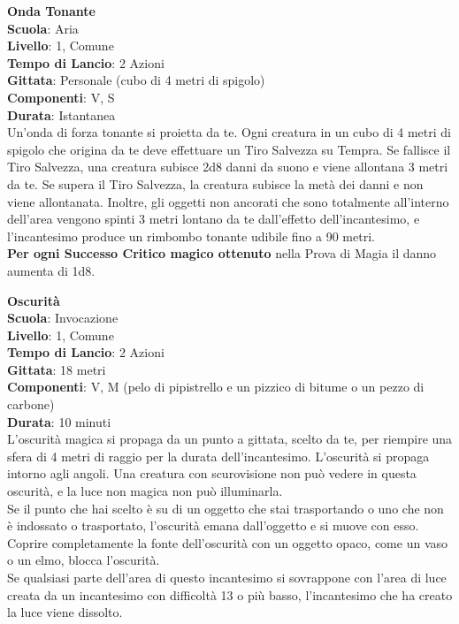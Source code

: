 \begin{multicols}{2}
\medskip\textbf{Onda Tonante}\\
\textbf{Scuola}: Aria\\
\textbf{Livello}: 1, Comune\\
\textbf{Tempo di Lancio}: 2 Azioni\\
\textbf{Gittata}: Personale (cubo di 4 metri di spigolo)\\
\textbf{Componenti}: V, S\\
\textbf{Durata}: Istantanea\\
Un'onda di forza tonante si proietta da te. Ogni creatura in un cubo di 4 metri di spigolo che origina da te deve effettuare un Tiro Salvezza su Tempra. Se fallisce il Tiro Salvezza, una creatura subisce 2d8 danni da suono e viene allontana 3 metri da te. Se supera il Tiro Salvezza, la creatura subisce la metà dei danni e non viene allontanata. Inoltre, gli oggetti non ancorati che sono totalmente all'interno dell'area vengono spinti 3 metri lontano da te dall'effetto dell'incantesimo, e l'incantesimo produce un rimbombo tonante udibile fino a 90 metri.\\
\textbf{Per ogni Successo Critico magico ottenuto} nella Prova di Magia il danno aumenta di 1d8.

\medskip\textbf{Oscurità}\\
\textbf{Scuola}: Invocazione\\
\textbf{Livello}: 1, Comune\\
\textbf{Tempo di Lancio}: 2 Azioni\\
\textbf{Gittata}: 18 metri\\
\textbf{Componenti}: V, M (pelo di pipistrello e un pizzico di bitume o un pezzo di carbone)\\
\textbf{Durata}: 10 minuti\\
L'oscurità magica si propaga da un punto a gittata, scelto da te, per riempire una sfera di 4 metri di raggio per la durata dell'incantesimo. L'oscurità si propaga intorno agli angoli. Una creatura con scurovisione non può vedere in questa oscurità, e la luce non magica non può illuminarla.\\
Se il punto che hai scelto è su di un oggetto che stai trasportando o uno che non è indossato o trasportato, l'oscurità emana dall'oggetto e si muove con esso. Coprire completamente la fonte dell'oscurità con un oggetto opaco, come un vaso o un elmo, blocca l'oscurità.\\
Se qualsiasi parte dell'area di questo incantesimo si sovrappone con l'area di luce creata da un incantesimo con difficoltà 13 o più basso, l'incantesimo che ha creato la luce viene dissolto.


\end{multicols}
